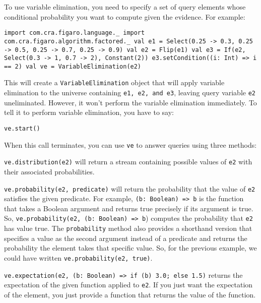 To use variable elimination, you need to specify a set of query elements whose conditional probability you want to compute given the evidence. For example:

\begin{flushleft}
\texttt{import com.cra.figaro.language.\_
\newline import com.cra.figaro.algorithm.factored.\_
\newline 
\newline val e1 = Select(0.25 -> 0.3, 0.25 -> 0.5, 0.25 -> 0.7, 0.25 -> 0.9)
\newline val e2 = Flip(e1)
\newline val e3 = If(e2, Select(0.3 -> 1, 0.7 -> 2), Constant(2))
\newline e3.setCondition((i: Int) => i == 2)
\newline 
\newline val ve = VariableElimination(e2)}
\end{flushleft}

This will create a \texttt{VariableElimination} object that will apply variable elimination to the universe containing \texttt{e1, e2, and e3}, leaving query variable \texttt{e2} uneliminated. However, it won't perform the variable elimination immediately. To tell it to perform variable elimination, you have to say:

\begin{flushleft}
\texttt{ve.start()}
\end{flushleft}

When this call terminates, you can use \texttt{ve} to answer queries using three methods:

\texttt{ve.distribution(e2)}  will return a stream containing possible values of \texttt{e2} with their associated probabilities.

\texttt{ve.probability(e2, predicate)} will return the probability that the value of \texttt{e2} satisfies the given predicate. For example, \texttt{(b: Boolean) => b} is the function that takes a  Boolean argument and returns true precisely if its argument is true. So, \texttt{ve.probability(e2, (b: Boolean) => b}) computes the probability that \texttt{e2} has value true. The \texttt{probability} method also provides a shorthand version that specifies a value as the second argument instead of a predicate and returns the probability the element takes that specific value. So, for the previous example, we could have written \texttt{ve.probability(e2, true)}.

\texttt{ve.expectation(e2, (b: Boolean) => if (b) 3.0; else 1.5)} returns the
expectation of the given function applied to \texttt{e2}. If you just want the expectation of the element, you just provide a function that returns the value of the function.

